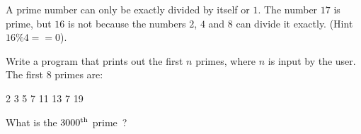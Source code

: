 A prime number can only be exactly divided by itself
or $1$. The number $17$ is prime, but $16$ is not because
the numbers $2$, $4$ and $8$ can divide it exactly.
(Hint~$16\%4 == 0$).
\begin{exercise}
Write a program that prints out the first $n$ primes, where
$n$ is input by the user. The first $8$ primes are:
\begin{terminaloutput}
2
3
5
7
11
13
7
19
\end{terminaloutput}
What is the $3000^{\rm th}$ prime~?
\end{exercise}
